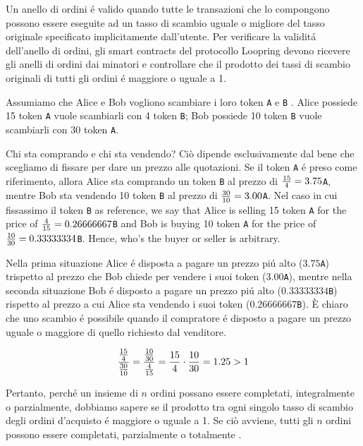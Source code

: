 \documentclass[UTF8,nofonts]{article}
\begin{document}
\begin{multicols}{2}
Un anello di ordini \'e valido quando tutte le transazioni che lo compongono possono essere eseguite ad un tasso di scambio uguale o migliore del tasso originale specificato implicitamente dall'utente. Per verificare la validit\'a dell'anello di ordini, gli smart contracts del protocollo Loopring devono ricevere gli anelli di ordini dai minatori e controllare che il prodotto dei tassi di scambio originali di tutti gli ordini \'e maggiore o uguale a 1.

Assumiamo che Alice e Bob vogliono scambiare i loro token \verb|A| e \verb|B| . Alice possiede 15 token \verb|A| vuole scambiarli con 4 token \verb|B|; Bob possiede 10 token \verb|B| vuole scambiarli con 30 token \verb|A|.

Chi sta comprando e chi sta vendendo? Ciò dipende esclusivamente dal bene che scegliamo di fissare per dare un prezzo alle quotazioni. Se il token \verb|A|  \'e preso come riferimento, allora Alice sta comprando un token \verb|B| al prezzo di ${15 \over 4} = 3.75$\verb|A|, mentre Bob sta vendendo 10 token \verb|B| al prezzo di ${30 \over 10} = 3.00$\verb|A|. Nel caso in cui fissassimo il token \verb|B| as reference, we say that Alice is selling 15 token \verb|A| for the price of ${4\over 15}=0.26666667$\verb|B| and Bob is buying 10 token \verb|A| for the price of ${10 \over 30}=0.33333334$\verb|B|. Hence, who's the buyer or seller is arbitrary.

Nella prima situazione Alice \'e disposta a pagare un prezzo pi\'u alto ($3.75$\verb|A|) trispetto al prezzo che Bob chiede per vendere i suoi token ($3.00$\verb|A|), mentre nella seconda situazione Bob \'e disposto a pagare un prezzo pi\'u alto ($0.33333334$\verb|B|) rispetto al prezzo a cui Alice sta vendendo i suoi token ($0.26666667$\verb|B|). È chiaro che uno scambio \'e possibile quando il compratore \'e disposto a pagare un prezzo uguale o maggiore di quello richiesto dal venditore.

\begin{equation}
{{15\over 4} \over {30\over 10}} = {{10\over 30} \over {4\over 15}}={15 \over 4} \cdot {10 \over 30} = 1.25 > 1
\end{equation}

Pertanto, perch\'e un insieme di $n$ ordini possano essere completati, integralmente o parzialmente, dobbiamo sapere se il prodotto tra ogni singolo tasso di scambio degli ordini d'acquisto \'e maggiore o uguale a 1. Se ciò avviene, tutti gli $n$ ordini possono essere completati, parzialmente o totalmente \cite{supersymmetry}.


\end{multicols}
\end{document}
